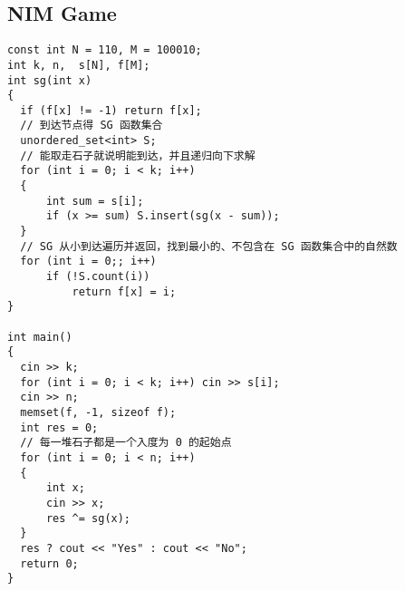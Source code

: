 \subsection{NIM Game}
\begin{lstlisting}
const int N = 110, M = 100010;
int k, n,  s[N], f[M];
int sg(int x)
{
  if (f[x] != -1) return f[x];
  // 到达节点得 SG 函数集合
  unordered_set<int> S;
  // 能取走石子就说明能到达，并且递归向下求解
  for (int i = 0; i < k; i++)
  {
      int sum = s[i];
      if (x >= sum) S.insert(sg(x - sum));
  }
  // SG 从小到达遍历并返回，找到最小的、不包含在 SG 函数集合中的自然数
  for (int i = 0;; i++)
      if (!S.count(i))
          return f[x] = i;
}

int main()
{
  cin >> k;
  for (int i = 0; i < k; i++) cin >> s[i];
  cin >> n;
  memset(f, -1, sizeof f);
  int res = 0;
  // 每一堆石子都是一个入度为 0 的起始点
  for (int i = 0; i < n; i++)
  {
      int x;
      cin >> x;
      res ^= sg(x);
  }
  res ? cout << "Yes" : cout << "No";
  return 0;
}
\end{lstlisting}
